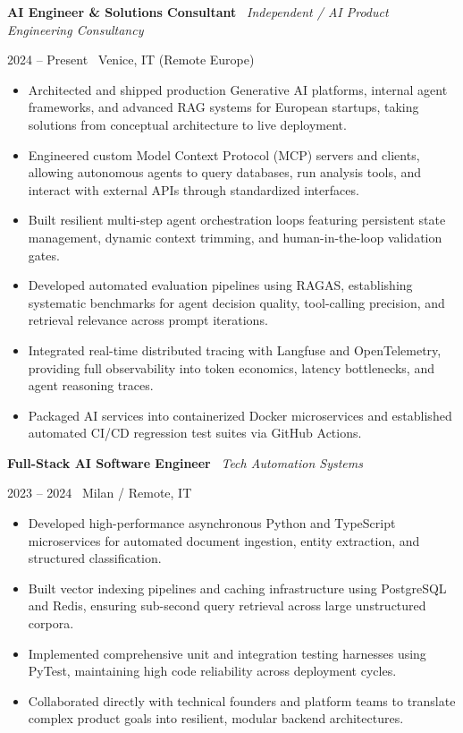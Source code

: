 \documentclass[a4paper,10pt]{article}
\newcommand{\role}[4]{%
  \vspace{2pt}\noindent
  \begin{minipage}[t]{0.70\textwidth}\raggedright\textbf{#1} \textbullet\ \textit{#3}\end{minipage}%
  \hfill
  \begin{minipage}[t]{0.28\textwidth}\raggedleft\footnotesize\color{gray}#2 \textbullet\ #4\end{minipage}%
  \vspace{1pt}%
}
\begin{document}
\role{AI Engineer \& Solutions Consultant}{2024 -- Present}{Independent / AI Product Engineering Consultancy}{Venice, IT (Remote Europe)}
\begin{itemize}
  \item Architected and shipped production Generative AI platforms, internal agent frameworks, and advanced RAG systems for European startups, taking solutions from conceptual architecture to live deployment.
  \item Engineered custom Model Context Protocol (MCP) servers and clients, allowing autonomous agents to query databases, run analysis tools, and interact with external APIs through standardized interfaces.
  \item Built resilient multi-step agent orchestration loops featuring persistent state management, dynamic context trimming, and human-in-the-loop validation gates.
  \item Developed automated evaluation pipelines using RAGAS, establishing systematic benchmarks for agent decision quality, tool-calling precision, and retrieval relevance across prompt iterations.
  \item Integrated real-time distributed tracing with Langfuse and OpenTelemetry, providing full observability into token economics, latency bottlenecks, and agent reasoning traces.
  \item Packaged AI services into containerized Docker microservices and established automated CI/CD regression test suites via GitHub Actions.
\end{itemize}

\vspace{3pt}
\role{Full-Stack AI Software Engineer}{2023 -- 2024}{Tech Automation Systems}{Milan / Remote, IT}
\begin{itemize}
  \item Developed high-performance asynchronous Python and TypeScript microservices for automated document ingestion, entity extraction, and structured classification.
  \item Built vector indexing pipelines and caching infrastructure using PostgreSQL and Redis, ensuring sub-second query retrieval across large unstructured corpora.
  \item Implemented comprehensive unit and integration testing harnesses using PyTest, maintaining high code reliability across deployment cycles.
  \item Collaborated directly with technical founders and platform teams to translate complex product goals into resilient, modular backend architectures.
\end{itemize}
\end{document}
